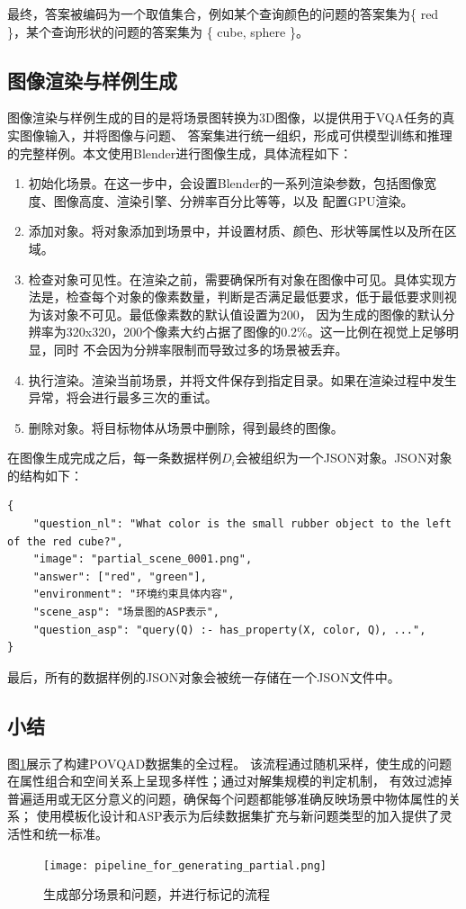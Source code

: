 最终，答案被编码为一个取值集合，例如某个查询颜色的问题的答案集为\{ red \}，某个查询形状的问题的答案集为
\{ cube, sphere \}。
\subsection{图像渲染与样例生成}
图像渲染与样例生成的目的是将场景图转换为3D图像，以提供用于VQA任务的真实图像输入，并将图像与问题、
答案集进行统一组织，形成可供模型训练和推理的完整样例。本文使用Blender进行图像生成，具体流程如下：
\begin{enumerate}[itemsep=0pt,parsep=0pt]
\item 初始化场景。在这一步中，会设置Blender的一系列渲染参数，包括图像宽度、图像高度、渲染引擎、分辨率百分比等等，以及
配置GPU渲染。
\item 添加对象。将对象添加到场景中，并设置材质、颜色、形状等属性以及所在区域。
\item 检查对象可见性。在渲染之前，需要确保所有对象在图像中可见。具体实现方法是，检查每个对象的像素数量，判断是否满足最低要求，低于最低要求则视为该对象不可见。最低像素数的默认值设置为200，
因为生成的图像的默认分辨率为320x320，200个像素大约占据了图像的0.2\%。这一比例在视觉上足够明显，同时
不会因为分辨率限制而导致过多的场景被丢弃。
\item 执行渲染。渲染当前场景，并将文件保存到指定目录。如果在渲染过程中发生异常，将会进行最多三次的重试。
\item 删除对象。将目标物体从场景中删除，得到最终的图像。
\end{enumerate}

在图像生成完成之后，每一条数据样例$D_i$会被组织为一个JSON对象。JSON对象的结构如下：
\begin{lstlisting}
{
    "question_nl": "What color is the small rubber object to the left of the red cube?",
    "image": "partial_scene_0001.png",
    "answer": ["red", "green"],
    "environment": "环境约束具体内容",
    "scene_asp": "场景图的ASP表示",
    "question_asp": "query(Q) :- has_property(X, color, Q), ...",
}
\end{lstlisting}

最后，所有的数据样例的JSON对象会被统一存储在一个JSON文件中。
\subsection{小结}
图\ref{pipeline_for_generating_partial}展示了构建POVQAD数据集的全过程。
该流程通过随机采样，使生成的问题在属性组合和空间关系上呈现多样性；通过对解集规模的判定机制，
有效过滤掉普遍适用或无区分意义的问题，确保每个问题都能够准确反映场景中物体属性的关系；
使用模板化设计和ASP表示为后续数据集扩充与新问题类型的加入提供了灵活性和统一标准。
\begin{figure}[h]
    \centering
    \texttt{[image: pipeline\_for\_generating\_partial.png]}
    \caption{生成部分场景和问题，并进行标记的流程}
    \label{pipeline_for_generating_partial}
\end{figure}
